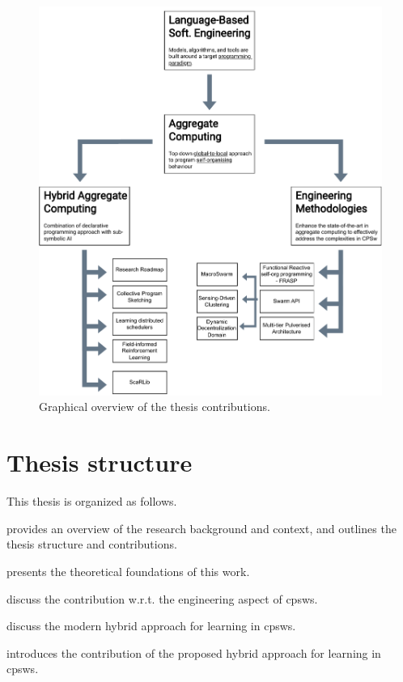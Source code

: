 \begin{figure}
    \includegraphics[width=\textwidth]{chapters/img/contribution-visual.drawio.pdf}
    \caption{Graphical overview of the thesis contributions.}
\end{figure}
\section{Thesis structure}
This thesis is organized as follows.

 provides an overview of the research background and context, 
 and outlines the thesis structure and contributions.

 presents the theoretical foundations of this work.

 discuss the contribution w.r.t. the engineering aspect of \acp{cpsw}.

 discuss the modern hybrid approach for learning in \acp{cpsw}.
\printbibliography[title=References]

 introduces the contribution of the proposed hybrid approach for learning in \acp{cpsw}.


